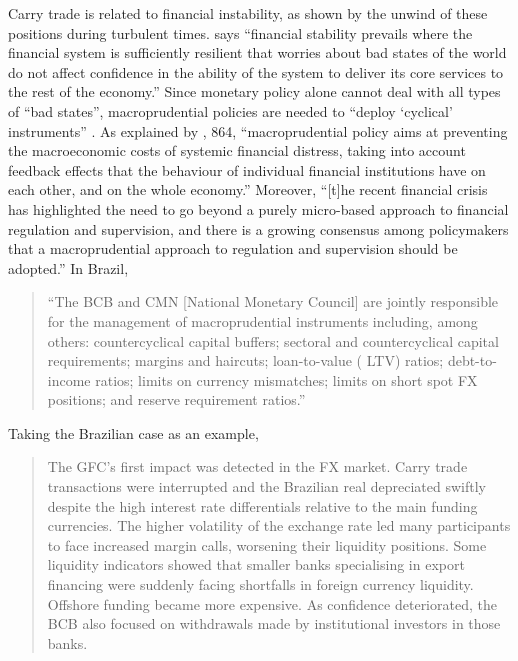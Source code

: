 \documentclass[a4paper, twoside]{templates/ociamthesis}
\begin{document}
Carry trade is related to financial instability, as shown by the unwind of these positions during turbulent times. \textcite[ 4]{tucker2011} says ``financial stability prevails where the financial system is sufficiently resilient that worries about bad states of the world do not affect confidence in the ability of the system to deliver its core services to the rest of the economy.'' Since monetary policy alone cannot deal with all types of ``bad states'', macroprudential policies are needed to ``deploy `cyclical' instruments'' \autocite[ 5]{tucker2011}. As explained by \textcite{galati2013},  864, ``macroprudential policy aims at preventing the macroeconomic costs of systemic financial distress, taking into account feedback effects that the behaviour of individual financial institutions have on each other, and on the whole economy.'' Moreover, ``{[}t{]}he recent financial crisis has highlighted the need to go beyond a purely micro-based approach to financial regulation and supervision, and there is a growing consensus among policymakers that a macroprudential approach to regulation and supervision should be adopted.'' \autocite[ 864]{galati2013} In Brazil,

\begin{quote}
``The BCB and CMN {[}National Monetary Council{]} are jointly responsible for the management of macroprudential instruments including, among others: countercyclical capital buffers; sectoral and countercyclical capital requirements; margins and haircuts; loan-to-value ( LTV) ratios; debt-to-income ratios; limits on currency mismatches; limits on short spot FX positions; and reserve requirement ratios.'' \autocite[ 78]{moura2017}
\end{quote}

Taking the Brazilian case as an example,

\begin{quote}
The GFC's first impact was detected in the FX market. Carry trade transactions were interrupted and the Brazilian real depreciated swiftly despite the high interest rate differentials relative to the main funding currencies. The higher volatility of the exchange rate led many participants to face increased margin calls, worsening their liquidity positions. Some liquidity indicators showed that smaller banks specialising in export financing were suddenly facing shortfalls in foreign currency liquidity. Offshore funding became more expensive. As confidence deteriorated, the BCB also focused on withdrawals made by institutional investors in those banks. \autocite[ 82]{moura2017}
\end{quote}
\end{document}
